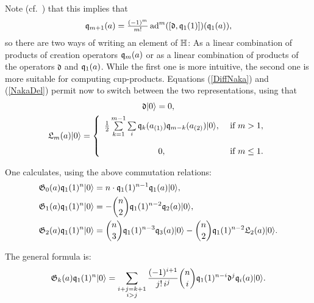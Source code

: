 \begin{remark}\label{HRep}
Note (cf.~\cite[Thm.~3.8]{LehnSorger}) that this implies that 
\begin{equation}\label{NakaDel}
\mathfrak{q}_{m+1}(a) = \tfrac{(-1)^m}{m!}\operatorname{ad}^m([\mathfrak{d},\mathfrak{q}_1(1)])(\mathfrak{q}_1(a)),
\end{equation}
so there are two ways of writing an element of $\mathbb{H}$: As a linear combination of products of creation operators $\mathfrak{q}_m(a)$ or as a linear combination of products of the operators $\mathfrak{d}$ and $\mathfrak{q}_1(a)$. While the first one is more intuitive, the second one is more suitable for computing cup-products. 
Equations (\ref{DiffNaka}) and (\ref{NakaDel}) permit now to switch between the two representations, using that
\begin{gather}
\mathfrak{d} \vac = 0 ,  \\
\mathfrak{L}_m(a) \vac = \left\{ 
\begin{array}{cl}
 \tfrac{1}{2}\sum\limits_{k=1}^{m-1}\sum\limits_{i}\q_k(a_{(1)})\q_{m-k}(a_{(2)})\vac, & \text{ if } m>1, \vspace{4mm}\\
 0, & \text{ if } m\leq 1. \\
\end{array}
\right.\\
\end{gather}
\end{remark}
\begin{example} 
One calculates, using the above commutation relations:
\begin{align}
 \mathfrak{G}_0(a)\mathfrak{q}_1(1)^n|0\rangle & = n\cdot \mathfrak{q}_1(1)^{n-1}\mathfrak{q}_1(a)|0\rangle, \\
 \mathfrak{G}_1(a)\mathfrak{q}_1(1)^n|0\rangle & = -\binom{n}{2} \mathfrak{q}_1(1)^{n-2}\mathfrak{q}_2(a)|0\rangle, \\
 \mathfrak{G}_2(a)\mathfrak{q}_1(1)^n|0\rangle & = \binom{n}{3} \mathfrak{q}_1(1)^{n-3}\mathfrak{q}_3(a)|0\rangle - \binom{n}{2} \mathfrak{q}_1(1)^{n-2}\mathfrak{L}_2(a)|0\rangle.
\end{align}
\end{example}
\begin{proposition}
The general formula is:
$$
\mathfrak{G}_k(a)\mathfrak{q}_1(1)^n|0\rangle = 
\sum_{\substack{i+j=k+1\\i>j}} \frac{(-1)^{i+1}}{j!\, i^j}\binom{n}{i} \mathfrak{q}_1(1)^{n-i} \mathfrak d^j \mathfrak{q}_i(a)|0\rangle.
$$
\end{proposition}
